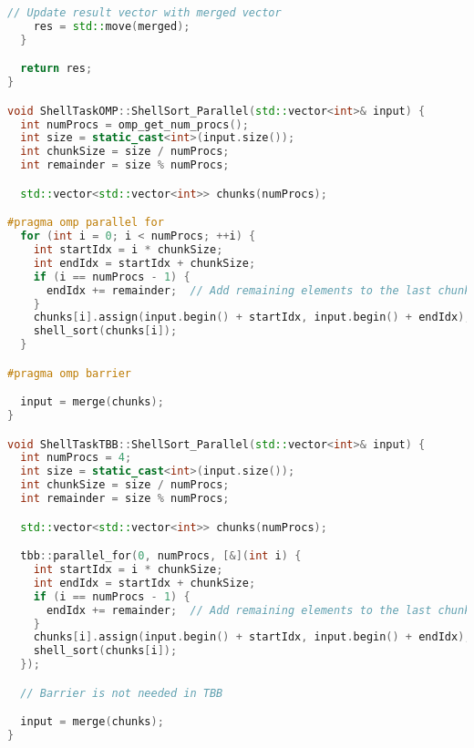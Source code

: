 \documentclass[]{article}
\theoremstyle{remark}
\theoremstyle{definition}
\begin{document}
\begin{lstlisting}[language=C++]
    // Update result vector with merged vector
    res = std::move(merged);
  }

  return res;
}

void ShellTaskOMP::ShellSort_Parallel(std::vector<int>& input) {
  int numProcs = omp_get_num_procs();
  int size = static_cast<int>(input.size());
  int chunkSize = size / numProcs;
  int remainder = size % numProcs;

  std::vector<std::vector<int>> chunks(numProcs);

#pragma omp parallel for
  for (int i = 0; i < numProcs; ++i) {
    int startIdx = i * chunkSize;
    int endIdx = startIdx + chunkSize;
    if (i == numProcs - 1) {
      endIdx += remainder;  // Add remaining elements to the last chunk
    }
    chunks[i].assign(input.begin() + startIdx, input.begin() + endIdx);
    shell_sort(chunks[i]);
  }

#pragma omp barrier

  input = merge(chunks);
}

void ShellTaskTBB::ShellSort_Parallel(std::vector<int>& input) {
  int numProcs = 4;
  int size = static_cast<int>(input.size());
  int chunkSize = size / numProcs;
  int remainder = size % numProcs;

  std::vector<std::vector<int>> chunks(numProcs);

  tbb::parallel_for(0, numProcs, [&](int i) {
    int startIdx = i * chunkSize;
    int endIdx = startIdx + chunkSize;
    if (i == numProcs - 1) {
      endIdx += remainder;  // Add remaining elements to the last chunk
    }
    chunks[i].assign(input.begin() + startIdx, input.begin() + endIdx);
    shell_sort(chunks[i]);
  });

  // Barrier is not needed in TBB

  input = merge(chunks);
}
\end{lstlisting}
\end{document}

